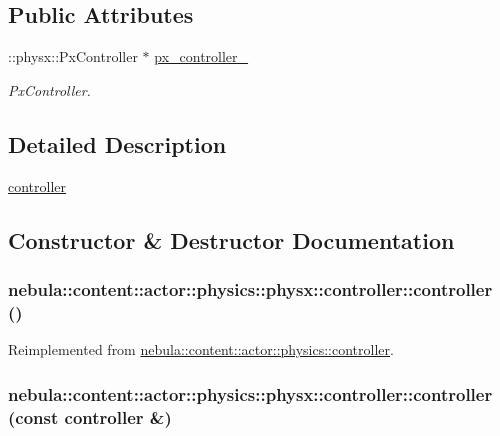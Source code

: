 \subsection*{Public Attributes}
\begin{DoxyCompactItemize}
\item 
::physx::PxController $\ast$ \hyperlink{classnebula_1_1content_1_1actor_1_1physics_1_1physx_1_1controller_a94536c60497730a5cd85ecfbdbc8b1ff}{px\_\-controller\_\-}
\begin{DoxyCompactList}\small\item\em PxController. \item\end{DoxyCompactList}\end{DoxyCompactItemize}


\subsection{Detailed Description}
\hyperlink{classnebula_1_1content_1_1actor_1_1physics_1_1physx_1_1controller}{controller} 

\subsection{Constructor \& Destructor Documentation}
\hypertarget{classnebula_1_1content_1_1actor_1_1physics_1_1physx_1_1controller_ab20fc96e41d814af4bf236280d6017a2}{
\subsubsection[{controller}]{\setlength{\rightskip}{0pt plus 5cm}nebula::content::actor::physics::physx::controller::controller ()}}
\label{classnebula_1_1content_1_1actor_1_1physics_1_1physx_1_1controller_ab20fc96e41d814af4bf236280d6017a2}


Reimplemented from \hyperlink{classnebula_1_1content_1_1actor_1_1physics_1_1controller_a532a28258d5389ff7f0b9e0e72ea295e}{nebula::content::actor::physics::controller}.\hypertarget{classnebula_1_1content_1_1actor_1_1physics_1_1physx_1_1controller_a5051e958aee9bb1e72b2503c127a2b7c}{
\subsubsection[{controller}]{\setlength{\rightskip}{0pt plus 5cm}nebula::content::actor::physics::physx::controller::controller (const {\bf controller} \&)}}
\label{classnebula_1_1content_1_1actor_1_1physics_1_1physx_1_1controller_a5051e958aee9bb1e72b2503c127a2b7c}


